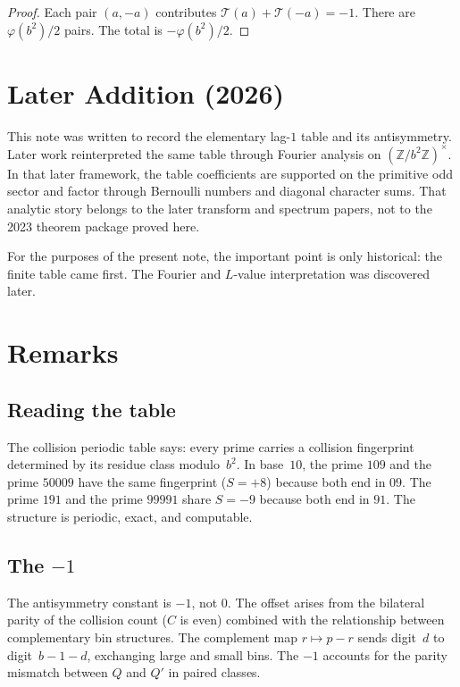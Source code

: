 \documentclass[12pt]{amsart}
\theoremstyle{definition}
\theoremstyle{remark}
\begin{document}
\begin{proof}
Each pair $(a, -a)$ contributes $\mathcal{T}(a) +
\mathcal{T}(-a) = -1$. There are $\varphi(b^2)/2$ pairs.
The total is $-\varphi(b^2)/2$.
\end{proof}

\section*{Later Addition (2026)}

This note was written to record the elementary lag-$1$
table and its antisymmetry. Later work reinterpreted the
same table through Fourier analysis on
$(\mathbb Z/b^2\mathbb Z)^{\times}$. In that later
framework, the table coefficients are supported on the
primitive odd sector and factor through Bernoulli numbers
and diagonal character sums. That analytic story belongs
to the later transform and spectrum papers, not to the
2023 theorem package proved here.

For the purposes of the present note, the important point
is only historical: the finite table came first. The
Fourier and $L$-value interpretation was discovered later.

\section{Remarks}

\subsection*{Reading the table}

The collision periodic table says: every prime carries a
collision fingerprint determined by its residue class
modulo~$b^2$. In base~$10$, the prime $109$ and the
prime $50009$ have the same fingerprint ($S = +8$) because
both end in $09$. The prime $191$ and the prime $99991$
share $S = -9$ because both end in $91$. The structure is
periodic, exact, and computable.

\subsection*{The $-1$}

The antisymmetry constant is $-1$, not $0$. The offset
arises from the bilateral parity of the collision count
($C$ is even) combined with the relationship between
complementary bin structures. The complement map
$r \mapsto p - r$ sends digit~$d$ to digit~$b{-}1{-}d$,
exchanging large and small bins. The $-1$ accounts for the
parity mismatch between $Q$ and $Q'$ in paired classes.
\end{document}
